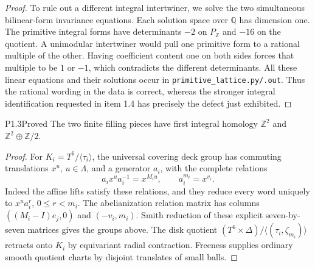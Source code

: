 \begin{proof}
To rule out a different integral intertwiner, we solve the two
simultaneous bilinear-form invariance equations.  Each solution space
over $\mathbb Q$ has dimension one.  The primitive integral forms have
determinants $-2$ on $P_{\mathbb Z}$ and $-16$ on the quotient.
A unimodular intertwiner would pull one primitive form to a rational
multiple of the other.  Having coefficient content one on both sides
forces that multiple to be $1$ or $-1$, which contradicts the different
determinants.  All these linear equations and their solutions occur in
\texttt{primitive\_lattice.py/.out}.  Thus the rational wording in the
data is correct, whereas the stronger integral identification requested
in item 1.4 has precisely the defect just exhibited.
\end{proof}

\begin{statement}{P1.3}{Proved}
The two finite filling pieces have first integral homology
$\mathbb Z^2$ and $\mathbb Z^2\oplus\mathbb Z/2$.
\end{statement}
\begin{proof}
For $K_i=T^6/\langle\tau_i\rangle$, the universal covering deck group
has commuting translations $x^u$, $u\in\Lambda$, and a generator $a_i$,
with the complete relations
\[
a_ix^ua_i^{-1}=x^{M_iu},\qquad a_i^{m_i}=x^{v_i}.
\]
Indeed the affine lifts satisfy these relations, and they reduce every
word uniquely to $x^ua_i^r$, $0\leq r<m_i$.
The abelianization relation matrix has columns
$((M_i-I)e_j,0)$ and $(-v_i,m_i)$.
Smith reduction of these explicit seven-by-seven matrices gives the
groups above.  The disk quotient
$(T^6\times\Delta)/\langle(\tau_i,\zeta_{m_i})\rangle$
retracts onto $K_i$ by equivariant radial contraction.  Freeness supplies
ordinary smooth quotient charts by disjoint translates of small balls.
\end{proof}

